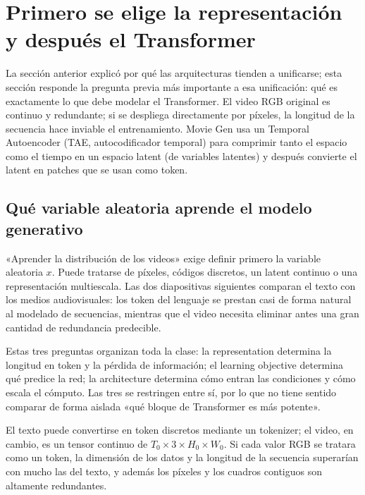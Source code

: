 \section{Primero se elige la representación y después el Transformer}

La sección anterior explicó por qué las arquitecturas tienden a unificarse; esta sección responde la pregunta previa más importante a esa unificación: qué es exactamente lo que debe modelar el Transformer. El video RGB original es continuo y redundante; si se despliega directamente por píxeles, la longitud de la secuencia hace inviable el entrenamiento. Movie Gen usa un Temporal Autoencoder (TAE, autocodificador temporal) para comprimir tanto el espacio como el tiempo en un espacio latent (de variables latentes) y después convierte el latent en patches que se usan como token.

\subsection{Qué variable aleatoria aprende el modelo generativo}

«Aprender la distribución de los videos» exige definir primero la variable aleatoria $x$. Puede tratarse de píxeles, códigos discretos, un latent continuo o una representación multiescala. Las dos diapositivas siguientes comparan el texto con los medios audiovisuales: los token del lenguaje se prestan casi de forma natural al modelado de secuencias, mientras que el video necesita eliminar antes una gran cantidad de redundancia predecible.


Estas tres preguntas organizan toda la clase: la representation determina la longitud en token y la pérdida de información; el learning objective determina qué predice la red; la architecture determina cómo entran las condiciones y cómo escala el cómputo. Las tres se restringen entre sí, por lo que no tiene sentido comparar de forma aislada «qué bloque de Transformer es más potente».


El texto puede convertirse en token discretos mediante un tokenizer; el video, en cambio, es un tensor continuo de $T_0\times3\times H_0\times W_0$. Si cada valor RGB se tratara como un token, la dimensión de los datos y la longitud de la secuencia superarían con mucho las del texto, y además los píxeles y los cuadros contiguos son altamente redundantes.

